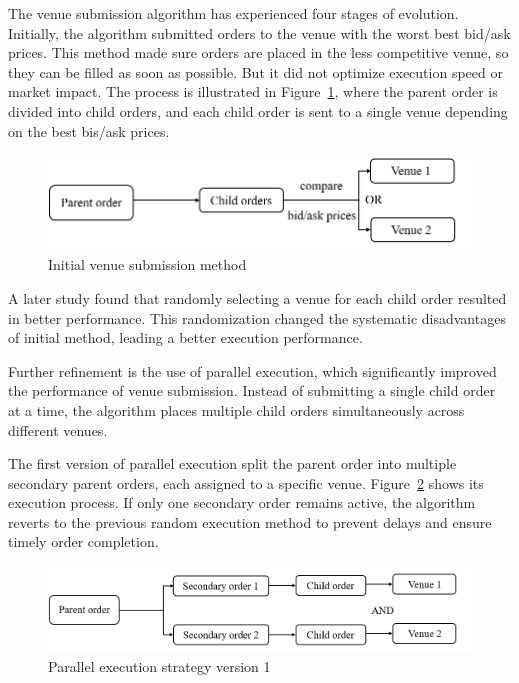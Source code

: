 The venue submission algorithm has experienced four stages of evolution. Initially, the algorithm submitted orders to the venue with the worst best bid/ask prices. This method made sure orders are placed in the less competitive venue, so they can be filled as soon as possible. But it did not optimize execution speed or market impact. The process is illustrated in Figure~\ref{fig:venue_submission_1}, where the parent order is divided into child orders, and each child order is sent to a single venue depending on the best bis/ask prices.

\begin{figure}[h]
    \centering
    \includegraphics[width=0.8\linewidth]{figures/venue_submission_1.png}
    \caption{Initial venue submission method}
    \label{fig:venue_submission_1}
\end{figure}

A later study \citep{romy2023} found that randomly selecting a venue for each child order resulted in better performance. This randomization changed the systematic disadvantages of initial method, leading a better execution performance.

Further refinement is the use of \gls{parallel execution}, which significantly improved the performance of venue submission. Instead of submitting a single child order at a time, the algorithm places multiple child orders simultaneously across different venues. 

The first version of parallel execution split the parent order into multiple secondary parent orders, each assigned to a specific venue. Figure~\ref{fig:venue_submission_2} shows its execution process. If only one secondary order remains active, the algorithm reverts to the previous random execution method to prevent delays and ensure timely order completion. 

\begin{figure}[h]
    \centering
    \includegraphics[width=0.8\linewidth]{figures/venue_submission_2.png}
    \caption{Parallel execution strategy version 1}
    \label{fig:venue_submission_2}
\end{figure}

